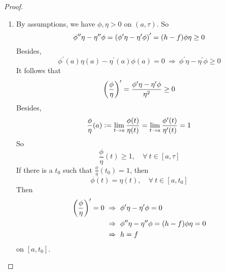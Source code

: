\begin{enumerate}[label=\arabic{*}.]
\begin{proof}
\begin{enumerate}[label=(\arabic{*})]
			\item By assumptions, we have $\phi,\eta > 0$ on $(a,\tau)$. So 
			\begin{equation*}
				\phi^{\prime\prime}\eta - \eta^{\prime\prime}\phi = \left(\phi^{\prime}\eta - \eta^{\prime}\phi\right)^\prime = (h-f)\phi\eta \geq 0
			\end{equation*}
			Besides,
			\begin{equation*}
				\phi^{\prime}(a)\eta(a) - \eta^{\prime}(a)\phi(a) = 0 ~\Rightarrow~ \phi^{\prime}\eta - \eta^{\prime}\phi \geq 0
			\end{equation*}
			It follows that
			\begin{equation*}
				\left(\frac{\phi}{\eta}\right)^\prime = \frac{\phi^{\prime}\eta - \eta^{\prime}\phi}{\eta^2} \geq 0
			\end{equation*}
			Besides,
			\begin{equation*}
				\frac{\phi}{\eta}(a) \vcentcolon= \lim_{t \rightarrow a}\frac{\phi(t)}{\eta(t)} = \lim_{t \rightarrow a}\frac{\phi^\prime(t)}{\eta^\prime(t)} = 1
			\end{equation*}
			So
			\begin{equation*}
				\frac{\phi}{\eta}(t) \geq 1,\quad \forall~t \in [a,\tau]
			\end{equation*}
			If there is a $t_0$ such that $\frac{\phi}{\eta}(t_0) = 1$, then
			\begin{equation*}
				\phi(t) = \eta(t),\quad \forall~t \in [a,t_0]
			\end{equation*}
			Then
			\begin{equation*}
				\begin{aligned}
					\left(\frac{\phi}{\eta}\right)^\prime = 0&~\Rightarrow~ \phi^{\prime}\eta - \eta^{\prime}\phi = 0 \\
					&~\Rightarrow~\phi^{\prime\prime}\eta - \eta^{\prime\prime}\phi =  (h-f)\phi\eta =0 \\
					&~\Rightarrow~h =f
				\end{aligned}
			\end{equation*}
			on $[a,t_0]$. \qedhere
		\end{enumerate}
	\end{proof}


\end{enumerate}
